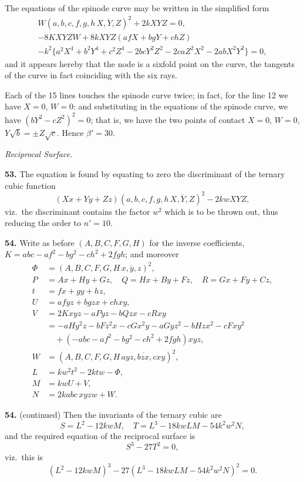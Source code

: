 \documentclass[11pt,a4paper]{article}
\theoremstyle{definition}
\begin{document}
The equations of the spinode curve may be written in the simplified form
\begin{multline*}
W(a, b, c, f, g, h \,\overline{\!\!X, Y, Z\!\!})^2 + 2kXYZ = 0, \\
-8KXYZW + 8kXYZ(afX + bgY + chZ) \\
- k^2\{a^2X^4 + b^2Y^4 + c^2Z^4 - 2bcY^2Z^2 - 2caZ^2X^2 - 2abX^2Y^2\} = 0,
\end{multline*}
and it appears hereby that the node is a sixfold point on the curve, the tangents of the curve in fact coinciding with the six rays.

Each of the 15 lines touches the spinode curve twice; in fact, for the line 12 we have $X = 0$, $W = 0$: and substituting in the equations of the spinode curve, we have $(bY^2 - cZ^2)^2 = 0$; that is, we have the two points of contact $X = 0$, $W = 0$, $Y\sqrt{b} = \pm Z\sqrt{c}$. Hence $\beta' = 30$.

\textit{Reciprocal Surface.}

\textbf{53.} The equation is found by equating to zero the discriminant of the ternary cubic function
\[
(Xx + Yy + Zz)(a, b, c, f, g, h \,\overline{\!\!X, Y, Z\!\!})^2 - 2kwXYZ,
\]
viz.\ the discriminant contains the factor $w^2$ which is to be thrown out, thus reducing the order to $n' = 10$.

\textbf{54.} Write as before $(A, B, C, F, G, H)$ for the inverse coefficients, $K = abc - af^2 - bg^2 - ch^2 + 2fgh$; and moreover
\begin{align*}
\Phi &= (A, B, C, F, G, H \,\overline{\!\!x, y, z\!\!})^2, \\
P &= Ax + Hy + Gz, \quad Q = Hx + By + Fz, \quad R = Gx + Fy + Cz, \\
t &= fx + gy + hz, \\
U &= afyz + bgzx + chxy, \\
V &= 2Kxyz - aPyz - bQzx - cRxy \\
  &= -aHy^2z - bFz^2x - cGx^2y - aGyz^2 - bHzx^2 - cFxy^2 \\
  &\quad + (-abc - af^2 - bg^2 - ch^2 + 2fgh)xyz, \\
W &= (A, B, C, F, G, H \,\overline{\!\!ayz, bzx, cxy\!\!})^2, \\
L &= kw^2t^2 - 2ktw - \Phi, \\
M &= kwU + V, \\
N &= 2kabc\,xyzw + W.
\end{align*}

\textbf{54.} (continued) Then the invariants of the ternary cubic are
\[
S = L^2 - 12kwM, \quad T = L^3 - 18kwLM - 54k^2w^2N,
\]
and the required equation of the reciprocal surface is
\[
S^3 - 27T^2 = 0,
\]
viz.\ this is
\[
(L^2 - 12kwM)^3 - 27(L^3 - 18kwLM - 54k^2w^2N)^2 = 0.
\]
\end{document}

